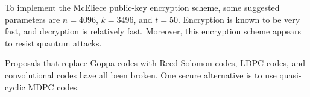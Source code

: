 \documentclass[10pt]{article}
\theoremstyle{newstyle}
\begin{document}
To implement the McEliece public-key encryption scheme, some suggested parameters are 
$n =4096$, $k = 3496$, and $t = 50$. Encryption is known to be very fast, and decryption is 
relatively fast. Moreover, this encryption scheme appears to resist quantum attacks. 

Proposals that replace Goppa codes with Reed-Solomon codes, LDPC codes, and convolutional codes 
have all been broken. One secure alternative is to use quasi-cyclic MDPC codes. 
\end{document}
